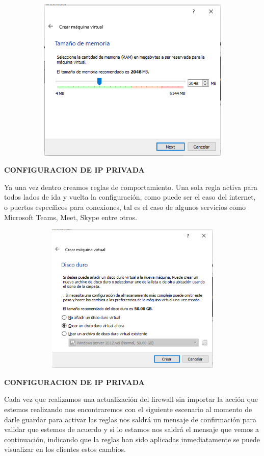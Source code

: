 \documentclass[
]{article}
\begin{document}
\includegraphics[width=6.1375in,height=3.09028in]{media/image5.png}

\textbf{CONFIGURACION DE IP PRIVADA}

Ya una vez dentro creamos reglas de comportamiento. Una sola regla
activa para todos lados de ida y vuelta la configuración, como puede ser
el caso del internet, o puertos específicos para conexiones, tal es el
caso de algunos servicios como Microsoft Teams, Meet, Skype entre otros.

\includegraphics[width=6.04375in,height=2.82292in]{media/image6.png}

\textbf{CONFIGURACION DE IP PRIVADA}

Cada vez que realizamos una actualización del firewall sin importar la
acción que estemos realizando nos encontraremos con el siguiente
escenario al momento de darle guardar para activar las reglas nos saldrá
un mensaje de confirmación para validar que estemos de acuerdo y si lo
estamos nos saldrá el mensaje que vemos a continuación, indicando que la
reglas han sido aplicadas inmediatamente se puede visualizar en los
clientes estos cambios.
\end{document}
